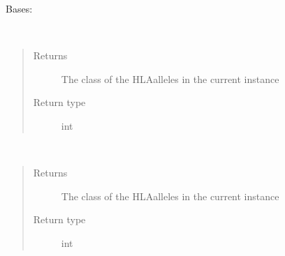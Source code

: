 \documentclass[letterpaper,10pt,english]{sphinxmanual}
\begin{document}
\begin{fulllineitems}
\label{\detokenize{IPTK.Classes:IPTK.Classes.HLASet.HLASet}}
Bases: 

\begin{fulllineitems}
\label{\detokenize{IPTK.Classes:IPTK.Classes.HLASet.HLASet.get_alleles}}~\begin{quote}\begin{description}
\item[{Returns}] \leavevmode
The class of the HLA\sphinxhyphen{}alleles in the current instance

\item[{Return type}] \leavevmode
int

\end{description}\end{quote}

\end{fulllineitems}


\begin{fulllineitems}
\label{\detokenize{IPTK.Classes:IPTK.Classes.HLASet.HLASet.get_class}}~\begin{quote}\begin{description}
\item[{Returns}] \leavevmode
The class of the HLA\sphinxhyphen{}alleles in the current instance

\item[{Return type}] \leavevmode
int

\end{description}\end{quote}


\end{fulllineitems}
\end{fulllineitems}
\end{document}
